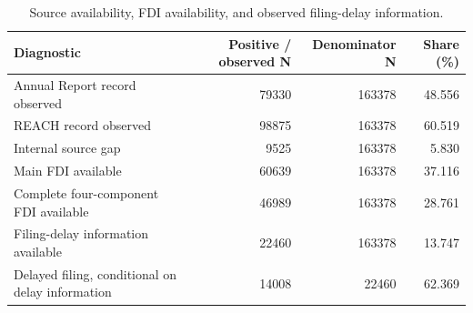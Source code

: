 \begin{table}
\caption{Source availability, FDI availability, and observed filing-delay information.}
\label{tab: data_availability}
\begin{tabular}{lrrr}
\toprule
Diagnostic & Positive / observed N & Denominator N & Share (\%) \\
\midrule
Annual Report record observed & 79330 & 163378 & 48.556 \\
REACH record observed & 98875 & 163378 & 60.519 \\
Internal source gap & 9525 & 163378 & 5.830 \\
Main FDI available & 60639 & 163378 & 37.116 \\
Complete four-component FDI available & 46989 & 163378 & 28.761 \\
Filing-delay information available & 22460 & 163378 & 13.747 \\
Delayed filing, conditional on delay information & 14008 & 22460 & 62.369 \\
\bottomrule
\end{tabular}
\end{table}
